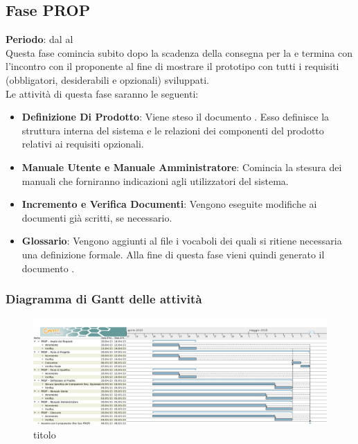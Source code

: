 \subsection{Fase PROP}
	\textbf{Periodo}: dal  al  \\Questa fase comincia subito dopo la scadenza della consegna per la  e termina con l'incontro con il proponente al fine di mostrare il prototipo con tutti i requisiti (obbligatori, desiderabili e opzionali) sviluppati. 
	\\Le attività di questa fase saranno le seguenti:
	\begin{itemize}
		\item\textbf{Definizione Di Prodotto}: Viene steso il documento . Esso definisce la struttura interna del sistema e le relazioni dei componenti del prodotto relativi ai requisiti opzionali.
		\item\textbf{Manuale Utente e Manuale Amministratore}: Comincia la stesura dei manuali che forniranno indicazioni agli utilizzatori del sistema.
		\item\textbf{Incremento e Verifica Documenti}: Vengono eseguite modifiche ai documenti già scritti, se necessario.
		\item\textbf{Glossario}: Vengono aggiunti al file  i vocaboli dei quali si ritiene necessaria una definizione formale. Alla fine di questa fase vieni quindi generato il documento .
	\end{itemize}
	\subsubsection{Diagramma di Gantt delle attività}
	\begin{figure}\centering
		\includegraphics[scale=0.325]{PianoDiProgetto/Pics/FasePROP.png}
	\caption{titolo}
\end{figure}